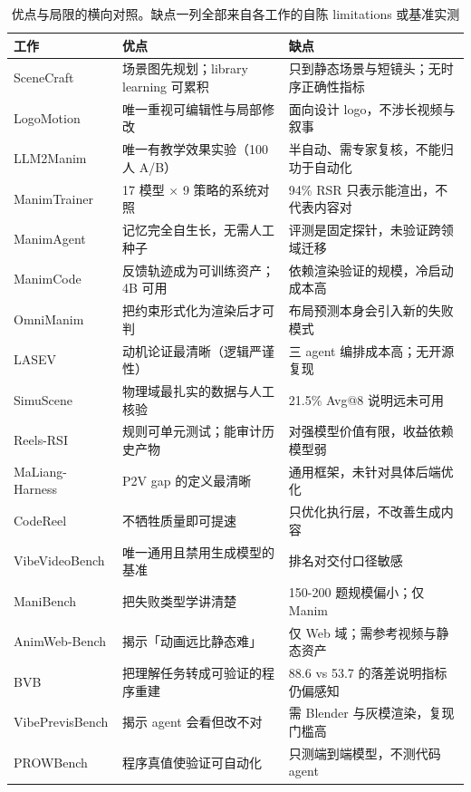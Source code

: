\begin{table}[t]
\centering
\footnotesize
\setlength{\tabcolsep}{4pt}
\caption{优点与局限的横向对照。缺点一列全部来自各工作的自陈 limitations 或基准实测}
\label{tab:4}
\begin{tabularx}{\textwidth}{lXl}
\toprule
工作 & 优点 & 缺点 \\
\midrule
SceneCraft & 场景图先规划；library learning 可累积 & 只到静态场景与短镜头；无时序正确性指标 \\
LogoMotion & 唯一重视可编辑性与局部修改 & 面向设计 logo，不涉长视频与叙事 \\
LLM2Manim & 唯一有教学效果实验（100 人 A/B） & 半自动、需专家复核，不能归功于自动化 \\
ManimTrainer & 17 模型 × 9 策略的系统对照 & 94\% RSR 只表示能渲出，不代表内容对 \\
ManimAgent & 记忆完全自生长，无需人工种子 & 评测是固定探针，未验证跨领域迁移 \\
ManimCode & 反馈轨迹成为可训练资产；4B 可用 & 依赖渲染验证的规模，冷启动成本高 \\
OmniManim & 把约束形式化为渲染后才可判 & 布局预测本身会引入新的失败模式 \\
LASEV & 动机论证最清晰（逻辑严谨性） & 三 agent 编排成本高；无开源复现 \\
SimuScene & 物理域最扎实的数据与人工核验 & 21.5\% Avg@8 说明远未可用 \\
Reels-RSI & 规则可单元测试；能审计历史产物 & 对强模型价值有限，收益依赖模型弱 \\
MaLiang-Harness & P2V gap 的定义最清晰 & 通用框架，未针对具体后端优化 \\
CodeReel & 不牺牲质量即可提速 & 只优化执行层，不改善生成内容 \\
VibeVideoBench & 唯一通用且禁用生成模型的基准 & 排名对交付口径敏感 \\
ManiBench & 把失败类型学讲清楚 & 150-\hspace{0pt}200 题规模偏小；仅 Manim \\
AnimWeb-Bench & 揭示「动画远比静态难」 & 仅 Web 域；需参考视频与静态资产 \\
BVB & 把理解任务转成可验证的程序重建 & 88.6 vs 53.7 的落差说明指标仍偏感知 \\
VibePrevisBench & 揭示 agent 会看但改不对 & 需 Blender 与灰模渲染，复现门槛高 \\
PROWBench & 程序真值使验证可自动化 & 只测端到端模型，不测代码 agent \\
\bottomrule
\end{tabularx}
\end{table}


